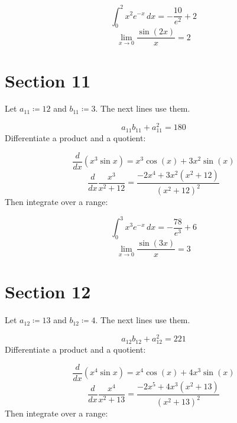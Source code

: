 \documentclass[11pt,a4paper]{article}
\theoremstyle{plain}
\theoremstyle{definition}
\theoremstyle{remark}
\begin{document}
\begin{equation*}
  \int_0^{2} x^{2} e^{-x} \, dx = -\frac{10}{e^{2}} + 2
\end{equation*}
\begin{equation*}
  \lim_{x \to 0} \frac{\sin(2 x)}{x} = 2
\end{equation*}
\section*{Section 11}

Let $a_{11} \coloneqq  12$ and $b_{11} \coloneqq  3$. The next lines use them.

\begin{equation*}
  a_{11} b_{11} + a_{11}^2 = 180
\end{equation*}
Differentiate a product and a quotient:

\begin{equation*}
  \frac{d}{dx} \left( x^{3} \sin x \right) = x^{3} \cos\left(x\right) + 3 x^{2} \sin\left(x\right)
\end{equation*}
\begin{equation*}
  \frac{d}{dx} \frac{x^{3}}{x^2 + 12} = \frac{-2 x^{4} + 3 x^{2} \left(x^{2} + 12\right)}{\left(x^{2} + 12\right)^{2}}
\end{equation*}
Then integrate over a range:

\begin{equation*}
  \int_0^{3} x^{3} e^{-x} \, dx = -\frac{78}{e^{3}} + 6
\end{equation*}
\begin{equation*}
  \lim_{x \to 0} \frac{\sin(3 x)}{x} = 3
\end{equation*}
\section*{Section 12}

Let $a_{12} \coloneqq  13$ and $b_{12} \coloneqq  4$. The next lines use them.

\begin{equation*}
  a_{12} b_{12} + a_{12}^2 = 221
\end{equation*}
Differentiate a product and a quotient:

\begin{equation*}
  \frac{d}{dx} \left( x^{4} \sin x \right) = x^{4} \cos\left(x\right) + 4 x^{3} \sin\left(x\right)
\end{equation*}
\begin{equation*}
  \frac{d}{dx} \frac{x^{4}}{x^2 + 13} = \frac{-2 x^{5} + 4 x^{3} \left(x^{2} + 13\right)}{\left(x^{2} + 13\right)^{2}}
\end{equation*}
Then integrate over a range:
\end{document}
